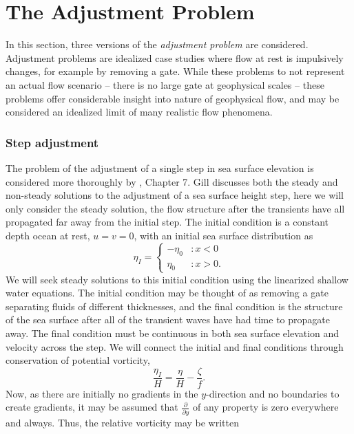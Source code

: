 \documentclass[11pt]{report}
\numberwithin{equation}{section}
\begin{document}
\section{The Adjustment Problem}

In this section, three versions of the {\it adjustment problem} are considered.  Adjustment problems are idealized case studies where flow at rest is impulsively changes, for example by removing a gate.  While these problems to not represent an actual flow scenario -- there is no large gate at geophysical scales -- these problems offer considerable insight into nature of geophysical flow, and may be considered an idealized limit of many realistic flow phenomena.

\subsubsection{Step adjustment}
The problem of the adjustment of a single step in sea surface elevation is considered more thoroughly by \citet{gill:82}, Chapter 7.  Gill discusses both the steady and non-steady solutions to the adjustment of a sea surface height step, here we will only consider the steady solution, the flow structure after the transients have all propagated far away from the initial step.  The initial condition is a constant depth ocean at rest, $u=v=0$, with an initial sea surface distribution as
\begin{displaymath}
    \eta_I =
    \begin{cases}
        - \eta_0  & :  x < 0 \\
          \eta_0  & :  x > 0.
    \end{cases}
\end{displaymath}
We will seek steady solutions to this initial condition using the linearized shallow water equations.  The initial condition may be thought of as removing a gate separating fluids of different thicknesses, and the final condition is the structure of the sea surface after all of the transient waves have had time to propagate away.  The final condition must be continuous in both sea surface elevation and velocity across the step.  We will connect the initial and final conditions through conservation of potential vorticity,
\begin{equation}
    \frac{\eta_I}{H} = \frac{\eta}{H} - \frac{\zeta}{f}.
\end{equation}
Now, as there are initially no gradients in the $y$-direction and no boundaries to create gradients, it may be assumed that $\frac{\partial}{\partial y}$ of any property is zero everywhere and always.  Thus, the relative vorticity may be written
\end{document}
